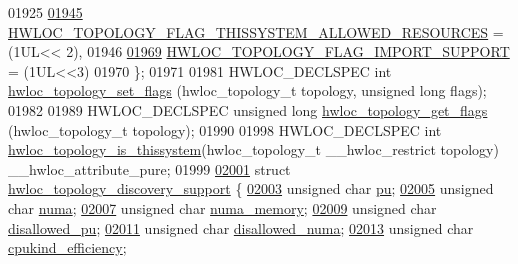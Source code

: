\begin{DoxyCode}
01925 
\hyperlink{a00193_ggada025d3ec20b4b420f8038d23d6e7bdea1b66bbd66e900e5c837f71defb32ad89}{01945}   \hyperlink{a00193_ggada025d3ec20b4b420f8038d23d6e7bdea1b66bbd66e900e5c837f71defb32ad89}{HWLOC\_TOPOLOGY\_FLAG\_THISSYSTEM\_ALLOWED\_RESOURCES} = (1UL<<
      2),
01946 
\hyperlink{a00193_ggada025d3ec20b4b420f8038d23d6e7bdead93e82b8668ee90e4f9354e201a2ed9c}{01969}   \hyperlink{a00193_ggada025d3ec20b4b420f8038d23d6e7bdead93e82b8668ee90e4f9354e201a2ed9c}{HWLOC\_TOPOLOGY\_FLAG\_IMPORT\_SUPPORT} = (1UL<<3)
01970 \};
01971 
01981 HWLOC\_DECLSPEC \textcolor{keywordtype}{int} \hyperlink{a00193_gaaeed4df656979e5f16befea9d29b814b}{hwloc\_topology\_set\_flags} (hwloc\_topology\_t topology, \textcolor{keywordtype}{unsigned} \textcolor{keywordtype}{
      long} flags);
01982 
01989 HWLOC\_DECLSPEC \textcolor{keywordtype}{unsigned} \textcolor{keywordtype}{long} \hyperlink{a00193_ga09318f81c1d4713be907d64748a6f93c}{hwloc\_topology\_get\_flags} (hwloc\_topology\_t topology);
01990 
01998 HWLOC\_DECLSPEC \textcolor{keywordtype}{int} \hyperlink{a00193_ga68ffdcfd9175cdf40709801092f18017}{hwloc\_topology\_is\_thissystem}(hwloc\_topology\_t  
      \_\_hwloc\_restrict topology) \_\_hwloc\_attribute\_pure;
01999 
\hyperlink{a00290}{02001} \textcolor{keyword}{struct }\hyperlink{a00290}{hwloc\_topology\_discovery\_support} \{
\hyperlink{a00290_ad7bb4ecf7a82f5a04fc632e9592ad3ab}{02003}   \textcolor{keywordtype}{unsigned} \textcolor{keywordtype}{char} \hyperlink{a00290_ad7bb4ecf7a82f5a04fc632e9592ad3ab}{pu};
\hyperlink{a00290_a955f96066cb9e4cd34e2a3710ad43e80}{02005}   \textcolor{keywordtype}{unsigned} \textcolor{keywordtype}{char} \hyperlink{a00290_a955f96066cb9e4cd34e2a3710ad43e80}{numa};
\hyperlink{a00290_af193eb858e40e12ef4923f5ed0e1f11a}{02007}   \textcolor{keywordtype}{unsigned} \textcolor{keywordtype}{char} \hyperlink{a00290_af193eb858e40e12ef4923f5ed0e1f11a}{numa\_memory};
\hyperlink{a00290_af3c97b28781a2972cf8eaaf94a6617da}{02009}   \textcolor{keywordtype}{unsigned} \textcolor{keywordtype}{char} \hyperlink{a00290_af3c97b28781a2972cf8eaaf94a6617da}{disallowed\_pu};
\hyperlink{a00290_a970e65235873bcdb9669a9805161ce03}{02011}   \textcolor{keywordtype}{unsigned} \textcolor{keywordtype}{char} \hyperlink{a00290_a970e65235873bcdb9669a9805161ce03}{disallowed\_numa};
\hyperlink{a00290_aba80d6f9c15e2395f9ed61db9ff3b75d}{02013}   \textcolor{keywordtype}{unsigned} \textcolor{keywordtype}{char} \hyperlink{a00290_aba80d6f9c15e2395f9ed61db9ff3b75d}{cpukind\_efficiency};

\end{DoxyCode}
